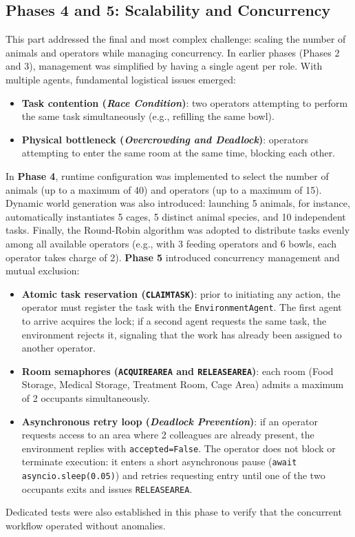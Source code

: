 \documentclass{article}
\renewcommand{\_}{\oldtextunderscore\allowbreak}
\begin{document}
\subsection{Phases 4 and 5: Scalability and Concurrency}
This part addressed the final and most complex challenge: scaling the number of animals and operators while managing concurrency. In earlier phases (Phases 2 and 3), management was simplified by having a single agent per role.
With multiple agents, fundamental logistical issues emerged:
\begin{itemize}
    \item \textbf{Task contention (\textit{Race Condition})}: two operators attempting to perform the same task simultaneously (e.g., refilling the same bowl).
    \item \textbf{Physical bottleneck (\textit{Overcrowding and Deadlock})}: operators attempting to enter the same room at the same time, blocking each other.
\end{itemize}
In \textbf{Phase 4}, runtime configuration was implemented to select the number of animals (up to a maximum of 40) and operators (up to a maximum of 15). Dynamic world generation was also introduced: launching 5 animals, for instance, automatically instantiates 5 cages, 5 distinct animal species, and 10 independent tasks. Finally, the Round-Robin algorithm was adopted to distribute tasks evenly among all available operators (e.g., with 3 feeding operators and 6 bowls, each operator takes charge of 2).
\textbf{Phase 5} introduced concurrency management and mutual exclusion:
\begin{itemize}
    \item \textbf{Atomic task reservation (\texttt{CLAIM\_TASK})}: prior to initiating any action, the operator must register the task with the \texttt{EnvironmentAgent}. The first agent to arrive acquires the lock; if a second agent requests the same task, the environment rejects it, signaling that the work has already been assigned to another operator.
    \item \textbf{Room semaphores (\texttt{ACQUIRE\_AREA} and \texttt{RELEASE\_AREA})}: each room (Food Storage, Medical Storage, Treatment Room, Cage Area) admits a maximum of 2 occupants simultaneously.
    \item \textbf{Asynchronous retry loop (\textit{Deadlock Prevention})}: if an operator requests access to an area where 2 colleagues are already present, the environment replies with \texttt{accepted=False}. The operator does not block or terminate execution: it enters a short asynchronous pause (\texttt{await asyncio.sleep(0.05)}) and retries requesting entry until one of the two occupants exits and issues \texttt{RELEASE\_AREA}.
\end{itemize}
Dedicated tests were also established in this phase to verify that the concurrent workflow operated without anomalies.
\end{document}
